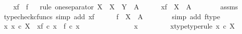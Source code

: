 \begin{isabellebody}
\ \ \isamarkupfalse%
\ {\isachardoublequoteopen}{\isasymphi}\isactrlbsub {\isacharbrackleft}{\kern0pt}{\isacharminus}{\kern0pt}{\isacharcomma}{\kern0pt}x{\isacharunderscore}{\kern0pt}f{\isacharbrackright}{\kern0pt}\isactrlesub \ {\isacharequal}{\kern0pt}\ f{\isachardoublequoteclose}\isanewline
\ \ \isamarkupfalse%
{\isacharparenleft}{\kern0pt}rule\ one{\isacharunderscore}{\kern0pt}separator{\isacharbrackleft}{\kern0pt}\ X\ {\isacharequal}{\kern0pt}\ {\isachardoublequoteopen}X{\isachardoublequoteclose}{\isacharcomma}{\kern0pt}\ \ Y\ {\isacharequal}{\kern0pt}\ A{\isacharbrackright}{\kern0pt}{\isacharparenright}{\kern0pt}\isanewline
\ \ \ \ \isamarkupfalse%
\ {\isachardoublequoteopen}{\isasymphi}\isactrlbsub {\isacharbrackleft}{\kern0pt}{\isacharminus}{\kern0pt}{\isacharcomma}{\kern0pt}x{\isacharunderscore}{\kern0pt}f{\isacharbrackright}{\kern0pt}\isactrlesub \ {\isacharcolon}{\kern0pt}\ X\ {\isasymrightarrow}\ A{\isachardoublequoteclose}\isanewline
\ \ \ \ \ \ \isamarkupfalse%
\ assms\ \isamarkupfalse%
\ {\isacharparenleft}{\kern0pt}typecheck{\isacharunderscore}{\kern0pt}cfuncs{\isacharcomma}{\kern0pt}\ simp\ add{\isacharcolon}{\kern0pt}\ x{\isacharunderscore}{\kern0pt}f{\isacharparenright}{\kern0pt}\isanewline
\ \ \ \ \isamarkupfalse%
\ {\isachardoublequoteopen}f\ {\isacharcolon}{\kern0pt}\ X\ {\isasymrightarrow}\ A{\isachardoublequoteclose}\isanewline
\ \ \ \ \ \ \isamarkupfalse%
\ {\isacharparenleft}{\kern0pt}simp\ add{\isacharcolon}{\kern0pt}\ f{\isacharunderscore}{\kern0pt}type{\isacharparenright}{\kern0pt}\isanewline
\ \ \ \ \isamarkupfalse%
\ {\isachardoublequoteopen}{\isasymAnd}x{\isachardot}{\kern0pt}\ x\ {\isasymin}\isactrlsub c\ X\ {\isasymLongrightarrow}\ {\isasymphi}\isactrlbsub {\isacharbrackleft}{\kern0pt}{\isacharminus}{\kern0pt}{\isacharcomma}{\kern0pt}x{\isacharunderscore}{\kern0pt}f{\isacharbrackright}{\kern0pt}\isactrlesub \ {\isasymcirc}\isactrlsub c\ x\ {\isacharequal}{\kern0pt}\ f\ {\isasymcirc}\isactrlsub c\ x{\isachardoublequoteclose}\isanewline
\ \ \ \ \isamarkupfalse%
\ {\isacharminus}{\kern0pt}\ \isanewline
\ \ \ \ \ \ \isamarkupfalse%
\ x\ \isanewline
\ \ \ \ \ \ \isamarkupfalse%
\ x{\isacharunderscore}{\kern0pt}type{\isacharbrackleft}{\kern0pt}type{\isacharunderscore}{\kern0pt}rule{\isacharbrackright}{\kern0pt}{\isacharcolon}{\kern0pt}\ {\isachardoublequoteopen}x\ {\isasymin}\isactrlsub c\ X{\isachardoublequoteclose}\isanewline

\end{isabellebody}
